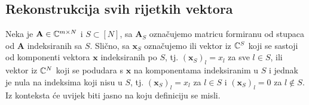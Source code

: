 \documentclass[a4paper,twoside,12pt]{memoir} %
\newcommand{\vect}[1]{\mathbf{#1}}
\renewcommand{\vec}{\vect}
\begin{document}
\subsection[Rekonstrukcija svih rijetkih vektora][Rekonstrukcija svih rijetkih vektora]{Rekonstrukcija svih rijetkih vektora}
Neka je $\vec{A} \in \C^{m \times N}$ i $S \subset [N]$, sa $\vec A_S$ ozna\v{c}ujemo matricu formiranu od stupaca od $\vec A$ indeksiranih sa $S$. Sli\v{c}no, sa $\vec x_S$ ozna\v{c}ujemo ili vektor iz $\mathbb{C}^{S}$ koji se sastoji od komponenti vektora $\vec x$ indeksiranih po $S$, tj. $(\vec x_S)_l = x_l$ za sve $l \in S$, ili vektor iz $\mathbb{C}^N$ koji se podudara s $\vec x$ na komponentama indeksiranim u $S$ i jednak je nula na indeksima koji nisu u $S$, tj. $(\vec x_S)_l = x_l$ za $l \in S$ i $(\vec x_S)_l =0$ za $ l \notin S$. Iz konteksta \'ce uvijek biti jasno na koju definiciju se misli.
\end{document}
